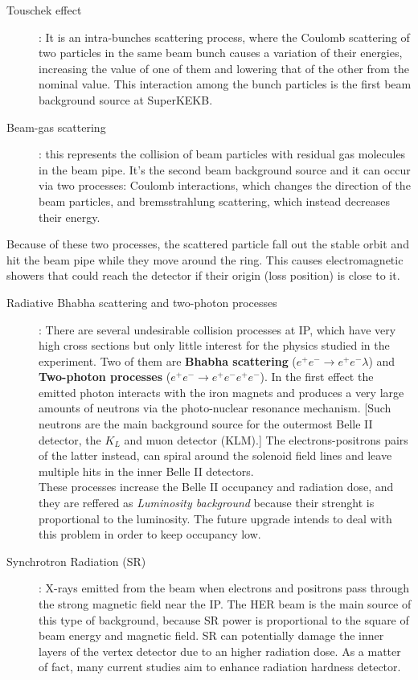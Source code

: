 \begin{description}
\item[Touschek effect]: 
	It is an intra-bunches scattering process, where the Coulomb scattering of two particles in the same beam bunch causes a variation of their energies, increasing the value of one of them and lowering that of the other from the nominal value. This interaction among the bunch particles is the first beam background source at SuperKEKB.
\item[Beam-gas scattering]: 
	this represents the collision of beam particles with residual gas molecules in the beam pipe. It's the second beam background source and it can occur via two processes: Coulomb interactions, which changes the direction of the beam particles, and bremsstrahlung scattering, which instead decreases their energy. 
\end{description}
	
Because of these two processes, the scattered particle fall out the stable orbit and hit the beam pipe while they move around the ring. This causes electromagnetic showers that could reach the detector if their origin (loss position) is close to it.


\begin{description}
\item[Radiative Bhabha scattering and two-photon processes]:
	There are several undesirable collision processes at IP, which have very high cross sections but only little interest for the physics studied in the experiment. Two of them are \textbf{Bhabha scattering} ($e^{+}e^{-} \rightarrow e^{+}e^{-} \lambda$) and \textbf{Two-photon processes} ($e^{+}e^{-} \rightarrow e^{+}e^{-}e^{+}e^{-} $). 
	In the first effect the emitted photon interacts with the iron magnets and produces a very large amounts of neutrons via the photo-nuclear resonance mechanism. [Such neutrons are the main background source for the outermost Belle II detector, the $K_{L}$ and muon detector (KLM).] The electrons-positrons pairs of the latter instead, can spiral around the solenoid field lines and leave multiple hits in the inner Belle II detectors.\\
	
These processes increase the Belle II occupancy and radiation dose, and they are reffered as \textit{Luminosity background} because their strenght is proportional to the luminosity. The future upgrade intends to deal with this problem in order to keep occupancy low.

\item[Synchrotron Radiation (SR)]:
	X-rays emitted from the beam when electrons and positrons pass through the strong magnetic field near the IP. The HER beam is the main source of this type of background, because SR power is proportional to the square of beam energy and magnetic field.
SR can potentially damage the inner layers of the vertex detector due to an higher radiation dose. As a matter of fact, many current studies aim to enhance radiation hardness detector.
\end{description}

